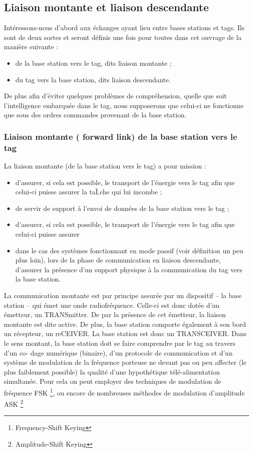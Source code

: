 \documentclass[11pt, a4paper, twoside]{book}
\begin{document}
\subsection{Liaison montante et liaison descendante}
Intéressons-nous d’abord aux échanges ayant lieu entre bases stations et tags. Ils sont de deux sortes et seront définis une fois pour toutes dans cet ouvrage de la manière suivante :
\begin{itemize}
\item de la base station vers le tag, dits liaison montante ;
\item du tag vers la base station, dits liaison descendante. \\
\end{itemize}
De plus afin d’éviter quelques problèmes de compréhension, quelle que soit l’intelligence embarquée dans le tag, nous supposerons que celui-ci ne fonctionne que sous des ordres commandes provenant de la base station. 
\subsubsection{Liaison montante ( forward link) de la base station vers le tag}
La liaison montante (de la base station vers le tag) a pour mission :
\begin{itemize}
\item d'assurer, si cela est possible, le transport de l'énergie vers le tag afin que celui-ci puisse assurer la taÌ‚che qui lui incombe ;
\item de servir de support à l'envoi de données de la base station vers le tag ;
\item d'assurer, si cela est possible, le transport de l'énergie vers le tag afin que celui-ci puisse assurer
\item dans le cas des systèmes fonctionnant en mode passif (voir définition un peu plus loin), lors de la phase de communication en liaison descendante, d'assurer la présence d'un support physique à la communication du tag vers la base station.\\
\end{itemize}

La communication montante est par principe assurée par un dispositif – la base station – qui émet une onde radiofréquence. Celle-ci est donc dotée d’un émetteur, un TRANSmitter. De par la présence de cet émetteur, la liaison montante est dite active. De plus, la base station comporte également à son bord un récepteur, un reCEIVER. La base station est donc un TRANSCEIVER. Dans le sens montant, la base station doit se faire comprendre par le tag au travers d’un co- dage numérique (binaire), d’un protocole de communication et d’un système de modulation de la fréquence porteuse ne devant pas ou peu affecter (le plus faiblement possible) la qualité d’une hypothétique télé-alimentation simultanée. Pour cela on peut employer des techniques de modulation de fréquence FSK \footnote{Frequency-Shift Keying}, ou encore de nombreuses méthodes de modulation d’amplitude ASK \footnote{Amplitude-Shift Keying}
\end{document}
